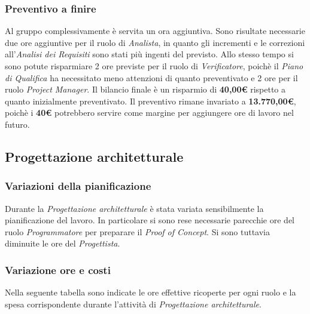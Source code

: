 \subsubsection{Preventivo a finire}
Al gruppo complessivamente è servita un ora aggiuntiva. Sono risultate necessarie due ore aggiuntive per il ruolo di \textit{Analista}, in quanto gli incrementi e le correzioni all'\textit{Analisi dei Requisiti} sono stati più ingenti del previsto. Allo stesso tempo si sono potute risparmiare 2 ore previste per il ruolo di \textit{Verificatore}, poichè il \textit{Piano di Qualifica} ha necessitato meno attenzioni di quanto preventivato e 2 ore per il ruolo \textit{Project Manager}. Il bilancio finale è un risparmio di \textbf{40,00\euro} rispetto a quanto inizialmente preventivato. Il preventivo rimane invariato a \textbf{13.770,00\euro}, poichè i \textbf{40\euro}  potrebbero servire come margine per aggiungere ore di lavoro nel futuro.


\subsection{Progettazione architetturale}
\subsubsection{Variazioni della pianificazione}
Durante la \textit{Progettazione architetturale} è stata variata sensibilmente la pianificazione del lavoro. In particolare si sono rese necessarie parecchie ore del ruolo \textit{Programmatore} per preparare il \textit{Proof of Concept}. Si sono tuttavia diminuite le ore del \textit{Progettista}.

\subsubsection{Variazione ore e costi}
Nella seguente tabella sono indicate le ore effettive ricoperte per ogni ruolo e la spesa corrispondente durante l'attività di \textit{Progettazione architetturale}.

